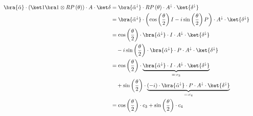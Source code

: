 \begin{equation}
    \label{eq:single-prob-simplification2}
    \begin{split}
        \bra{\tilde\alpha} \cdot (\ket 1 \bra 1 \otimes RP\left(\theta\right)) \cdot A \cdot \ket\delta
            &= \bra{\tilde\alpha^\downarrow} \cdot RP\left(\theta\right) \cdot A^\downarrow \cdot \ket{\delta^\downarrow} \\
            &= \bra{\tilde\alpha^\downarrow} \cdot \left(\cos\left(\frac\theta2\right) I - i \sin\left(\frac\theta2\right) P\right) \cdot A^\downarrow \cdot \ket{\delta^\downarrow} \\
            &= \cos\left(\frac\theta2\right) \cdot \bra{\tilde\alpha^\downarrow} \cdot I \cdot A^\downarrow \cdot \ket{\delta^\downarrow} \\
                &\quad - i \sin\left(\frac\theta2\right) \cdot \bra{\tilde\alpha^\downarrow} \cdot P \cdot A^\downarrow \cdot \ket{\delta^\downarrow} \\
            &= \cos\left(\frac\theta2\right) \cdot \underbrace{\bra{\tilde\alpha^\downarrow} \cdot I \cdot A^\downarrow \cdot \ket{\delta^\downarrow}}_{=: c_3} \\
                &\quad + \sin\left(\frac\theta2\right) \cdot \underbrace{\left(-i\right)\cdot \bra{\tilde\alpha^\downarrow} \cdot P \cdot A^\downarrow \cdot \ket{\delta^\downarrow}}_{=: c_4} \\
            &= \cos\left(\frac\theta2\right) \cdot c_3 + \sin\left(\frac\theta2\right) \cdot c_4
    \end{split}
\end{equation}

